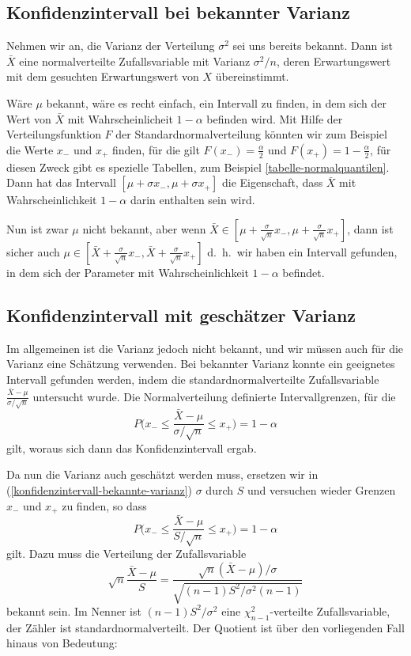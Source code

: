 \subsection{Konfidenzintervall bei bekannter Varianz}
Nehmen wir an, die Varianz der Verteilung $\sigma^2$ sei uns bereits bekannt.
Dann ist $\bar X$ eine normalverteilte Zufallsvariable mit Varianz
$\sigma^2/n$, deren Erwartungswert mit dem gesuchten Erwartungswert von $X$
übereinstimmt. 

Wäre $\mu$ bekannt, wäre es recht einfach, ein Intervall zu finden,
in dem sich der Wert von $\bar X$ mit Wahrscheinlicheit $1-\alpha$ befinden
wird.
Mit Hilfe der Verteilungsfunktion $F$ der Standardnormalverteilung
könnten wir zum Beispiel die Werte $x_-$ und $x_+$ finden, für die
gilt $F(x_-)=\frac{\alpha}{2}$ und $F(x_+)=1-\frac{\alpha}{2}$, für
diesen Zweck gibt es spezielle Tabellen, zum Beispiel
\ref{tabelle-normalquantilen}.
Dann hat das Intervall
$[\mu+\sigma x_-,\mu+\sigma x_+]$ die Eigenschaft, dass $\bar X$
mit Wahrscheinlichkeit $1-\alpha$ darin enthalten sein wird.

Nun ist zwar $\mu$ nicht bekannt, aber wenn
$\bar X\in[\mu+\frac{\sigma}{\sqrt{n}} x_-,\mu+\frac{\sigma}{\sqrt{n}} x_+]$,
dann ist sicher auch
$\mu\in[\bar X+\frac{\sigma}{\sqrt{n}} x_-,\bar X+\frac{\sigma}{\sqrt{n}} x_+]$
d.~h.~wir haben ein
Intervall gefunden, in dem sich der Parameter mit Wahrscheinlichkeit $1-\alpha$
befindet.

\subsection{Konfidenzintervall mit geschätzer Varianz}
Im allgemeinen ist die Varianz jedoch nicht bekannt, und wir müssen
auch für die Varianz eine Schätzung verwenden.
Bei bekannter Varianz
konnte ein geeignetes Intervall gefunden werden, indem die
standardnormalverteilte Zufallsvariable
$\frac{\bar X-\mu}{\sigma/\sqrt{n}}$
untersucht wurde.
Die Normalverteilung definierte Intervallgrenzen,
für die
\begin{equation}
P\biggl(x_-\le
\frac{\bar X-\mu}{\sigma/\sqrt{n}}
\le x_+\biggr)=1-\alpha
\label{konfidenzintervall-bekannte-varianz}
\end{equation}
gilt, woraus sich dann das Konfidenzintervall ergab.

Da nun die Varianz auch geschätzt werden muss, ersetzen wir in
(\ref{konfidenzintervall-bekannte-varianz})
$\sigma$ durch $S$ und versuchen wieder Grenzen
$x_-$ und $x_+$ zu finden, so dass
\begin{equation}
P\biggl(x_-\le
\frac{\bar X-\mu}{S/\sqrt{n}}
\le x_+\biggr)=1-\alpha
\label{konfidenzintervall-geschaetzte-varianz}
\end{equation}
gilt.
Dazu muss die Verteilung der Zufallsvariable
\begin{equation}
\sqrt{n}\frac{\bar X-\mu}{S}
=\frac{\sqrt{n}(\bar X-\mu)/\sigma}{\sqrt{(n-1)S^2/\sigma^2(n-1)}}
\label{konfidenzintervall-verteilung}
\end{equation}
bekannt sein.
Im Nenner ist $(n-1)S^2/\sigma^2$ eine
$\chi_{n-1}^2$-verteilte Zufallsvariable,
der Zähler ist standardnormalverteilt.
Der Quotient ist über den
vorliegenden Fall hinaus von Bedeutung:

